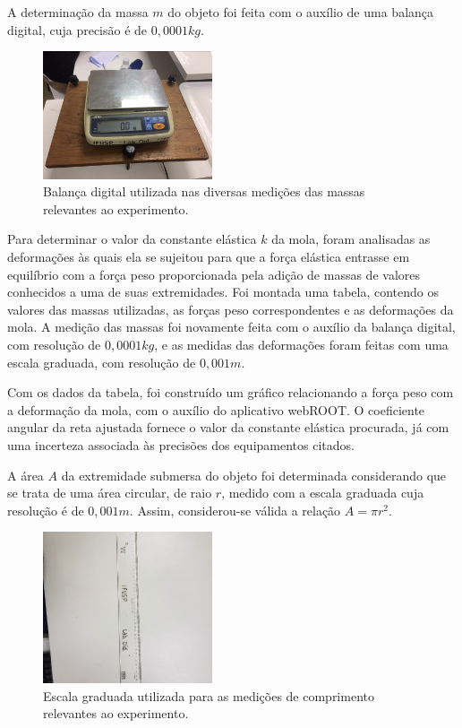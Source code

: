\documentclass[12pt]{article}
\begin{document}
		A determinação da massa $m$ do objeto foi feita com o auxílio de uma balança digital, cuja precisão é de $0,0001 kg$.

		\begin{figure}[H]
			\centering
			\includegraphics[width=5cm]{imagem_2.png}
			\caption{Balança digital utilizada nas diversas medições das massas relevantes ao experimento.}
			\label{fig:figura2}
		\end{figure}		
		
		Para determinar o valor da constante elástica $k$ da mola, foram analisadas as deformações às quais ela se sujeitou para que a força elástica entrasse em equilíbrio com a força peso proporcionada pela adição de massas de valores conhecidos a uma de suas extremidades. Foi montada uma tabela, contendo os valores das massas utilizadas, as forças peso correspondentes e as deformações da mola. A medição das massas foi novamente feita com o auxílio da balança digital, com resolução de $0,0001 kg$, e as medidas das deformações foram feitas com uma escala graduada, com resolução de $0,001 m$.
				
		Com os dados da tabela, foi construído um gráfico relacionando a força peso com a deformação da mola, com o auxílio do aplicativo webROOT. O coeficiente angular da reta ajustada fornece o valor da constante elástica procurada, já com uma incerteza associada às precisões dos equipamentos citados.
		
		A área $A$ da extremidade submersa do objeto foi determinada considerando que se trata de uma área circular, de raio $r$, medido com a escala graduada cuja resolução é de $0,001 m$. Assim, considerou-se válida a relação $A=\pi r^2$.
		
		\begin{figure}[H]
			\centering
			\includegraphics[width=5cm]{imagem_4.png}
			\caption{Escala graduada utilizada para as medições de comprimento relevantes ao experimento.}
			\label{fig:figura3}
		\end{figure}		
		
\end{document}
